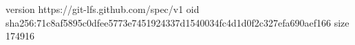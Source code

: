 version https://git-lfs.github.com/spec/v1
oid sha256:71c8af5895c0dfee5773e7451924337d1540034fc4d1d0f2c327efa690aef166
size 174916
